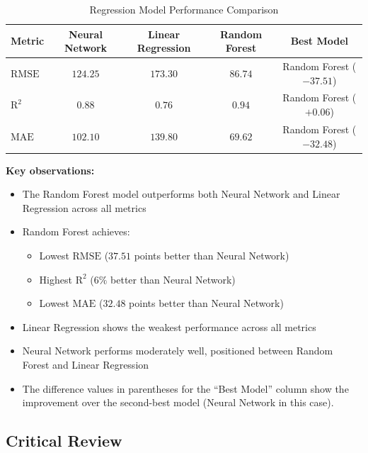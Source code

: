 \documentclass{article}
\begin{document}
\begin{table}[htbp]
    \centering
    \caption{Regression Model Performance Comparison}
    \begin{tabular}{lcccc}
        \toprule
        \textbf{Metric} & \textbf{Neural Network} & \textbf{Linear Regression} & \textbf{Random Forest} & \textbf{Best Model} \\
        \midrule
        $\text{RMSE}$ & $124.25$ & $173.30$ & $86.74$ & Random Forest (\(-37.51\)) \\
        $\text{R}^2$ & $0.88$ & $0.76$ & $0.94$ & Random Forest (\(+0.06\)) \\
        $\text{MAE}$ & $102.10$ & $139.80$ & $69.62$ & Random Forest (\(-32.48\)) \\
        \bottomrule
    \end{tabular}
    \label{tab:regression_comparison}
\end{table}

\newpage
\noindent\textbf{Key observations:}

\begin{itemize}
    \item The Random Forest model outperforms both Neural Network and Linear Regression across all metrics
    
    \item Random Forest achieves:
    \begin{itemize}
        \item Lowest $\text{RMSE}$ ($37.51$ points better than Neural Network)
        \item Highest $\text{R}^2$ ($6\%$ better than Neural Network)
        \item Lowest $\text{MAE}$ ($32.48$ points better than Neural Network)
    \end{itemize}
    
    \item Linear Regression shows the weakest performance across all metrics
    
    \item Neural Network performs moderately well, positioned between Random Forest and Linear Regression
    
    \item The difference values in parentheses for the ``Best Model'' column show the improvement over the second-best model (Neural Network in this case).
\end{itemize}

\subsection{Critical Review}
\end{document}
